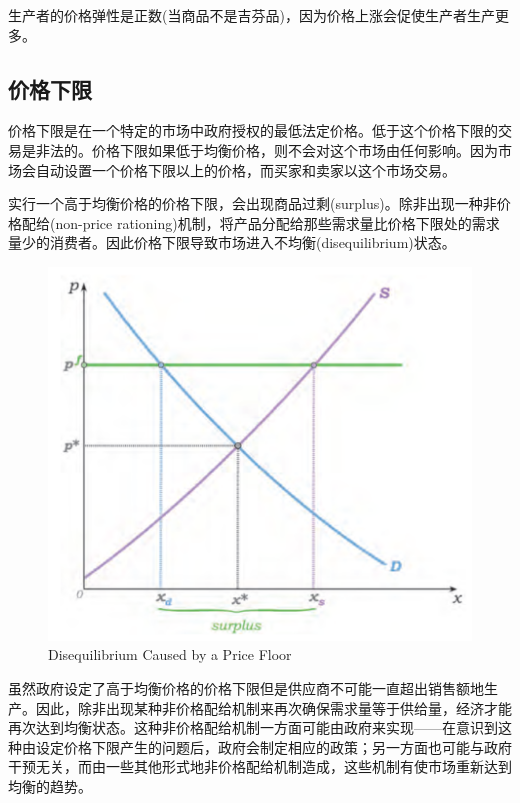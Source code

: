 \documentclass{article}
\begin{document}
生产者的价格弹性是正数(当商品不是吉芬品)，因为价格上涨会促使生产者生产更多。

\subsection{价格下限}

价格下限是在一个特定的市场中政府授权的最低法定价格。低于这个价格下限的交易是非法的。价格下限如果低于均衡价格，则不会对这个市场由任何影响。因为市场会自动设置一个价格下限以上的价格，而买家和卖家以这个市场交易。

实行一个高于均衡价格的价格下限，会出现商品过剩(surplus)。除非出现一种非价格配给(non-price rationing)机制，将产品分配给那些需求量比价格下限处的需求量少的消费者。因此价格下限导致市场进入不均衡(disequilibrium)状态。

\begin{figure}[H] %
	\centering %
	\includegraphics[width=1\textwidth]{18_4} %
	\caption{Disequilibrium Caused by a Price Floor} %
	\label{Fig.main5} %
\end{figure}

虽然政府设定了高于均衡价格的价格下限但是供应商不可能一直超出销售额地生产。因此，除非出现某种非价格配给机制来再次确保需求量等于供给量，经济才能再次达到均衡状态。这种非价格配给机制一方面可能由政府来实现——在意识到这种由设定价格下限产生的问题后，政府会制定相应的政策；另一方面也可能与政府干预无关，而由一些其他形式地非价格配给机制造成，这些机制有使市场重新达到均衡的趋势。
\end{document}
